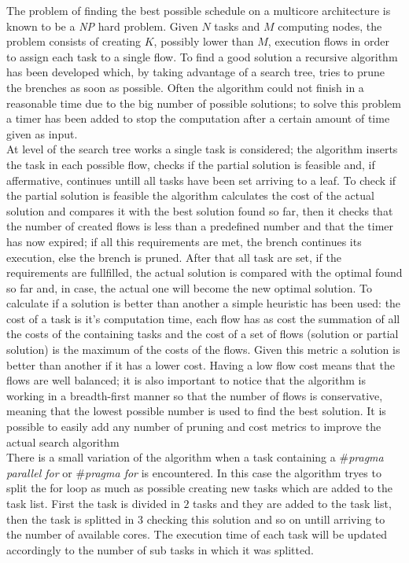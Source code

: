 \documentclass[a4paper,11pt,oneside]{book}
\begin{document}
The problem of finding the best possible schedule on a multicore architecture is known to be a \emph{NP} hard problem. Given $N$ tasks and $M$ computing nodes, the problem consists of creating $K$, possibly lower than $M$, execution flows in order to assign each task to a single flow. To find a good solution a recursive algorithm has been developed which, by taking advantage of a search tree, tries to prune the brenches as soon as possible. Often the algorithm could not finish in a reasonable time due to the big number of possible solutions; to solve this problem a timer has been added to stop the computation after a certain amount of time given as input. \\
At level of the search tree works a single task is considered; the algorithm inserts the task in each possible flow, checks if the partial solution is feasible and, if affermative, continues untill all tasks have been set arriving to a leaf. To check if the partial solution is feasible the algorithm calculates the cost of the actual solution and compares it with the best solution found so far, then it checks that the number of created flows is less than a predefined number and that the timer has now expired; if all this requirements are met, the brench continues its execution, else the brench is pruned. After that all task are set, if the requirements are fullfilled, the actual solution is compared with the optimal found so far and, in case, the actual one will become the new optimal solution. To calculate if a solution is better than another a simple heuristic has been used: the cost of a task is it's computation time, each flow has as cost the summation of all the costs of the containing tasks and the cost of a set of flows (solution or partial solution) is the maximum of the costs of the flows. Given this metric a solution is better than another if it has a lower cost. Having a low flow cost means that the flows are well balanced; it is also important to notice that the algorithm is working in a \emph{}breadth-first manner so that the number of flows is conservative, meaning that the lowest possible number is used to find the best solution. It is possible to easily add any number of pruning and cost metrics to improve the actual search algorithm\\
There is a small variation of the algorithm when a task containing a \emph{$\#$pragma parallel for} or \emph{$\#$pragma  for} is encountered. In this case the algorithm tryes to split the for loop as much as possible creating new tasks which are added to the task list. First the task is divided in $2$ tasks and they are added to the task list, then the task is splitted in $3$ checking this solution and so on untill arriving to the number of available cores. The execution time of each task will be updated accordingly to the number of sub tasks in which it was splitted. \\
\end{document}

